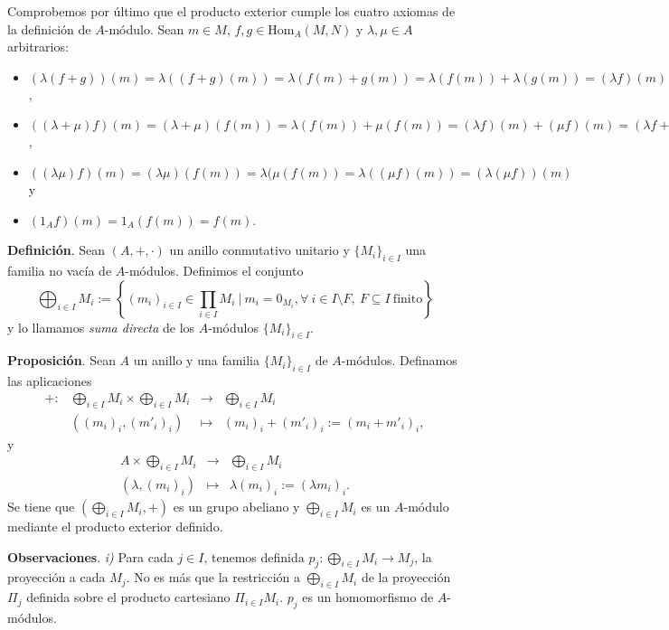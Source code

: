 \documentclass[a4paper,12pt]{article}
\newcommand{\Hom}{\text{Hom}}
\begin{document}
Comprobemos por último que el producto exterior cumple los cuatro axiomas de la definición de $A$-módulo. Sean $m\in M$, $f,g\in\Hom_A(M,N)$ y $\lambda,\mu\in A$ arbitrarios:
\begin{itemize}
    \item[\textit{i})] $(\lambda(f+g))(m)=\lambda((f+g)(m))=\lambda(f(m)+g(m))=\lambda(f(m))+\lambda(g(m))=(\lambda f)(m)+(\lambda g)(m)=(\lambda f+\lambda g)(m)$,
    \item[\textit{ii})] $((\lambda+\mu)f)(m)=(\lambda+\mu)(f(m))=\lambda(f(m))+\mu(f(m))=(\lambda f)(m)+(\mu f)(m)=(\lambda f+\mu f)(m)$,
    \item[\textit{iii})] $((\lambda\mu)f)(m)=(\lambda\mu)(f(m))=\lambda(\mu(f(m))=\lambda((\mu f)(m))=(\lambda(\mu f))(m)$ y
    \item[\textit{iv})] $(1_A f)(m)=1_A(f(m))=f(m)$.
\end{itemize}

\textbf{Definición}. Sean $(A,+,\cdot)$ un anillo conmutativo unitario y $\{M_i\}_{i\in I}$ una familia no vacía de $A$-módulos. Definimos el conjunto
$$
\bigoplus_{i\in I}M_i:=\left\{{(m_i)}_{i\in I}\in\prod_{i\in I}M_i\ |\ m_i=0_{M_i},\forall\ i\in I\setminus F,\ F\subseteq I\ \text{finito}\right\}
$$
y lo llamamos \textit{suma directa} de los $A$-módulos $\{M_i\}_{i\in I}$.

\textbf{Proposición}. Sean $A$ un anillo y una familia $\{M_i\}_{i\in I}$ de $A$-módulos. Definamos las aplicaciones
$$\begin{array}{rrcl}
    +:&\bigoplus_{i\in I}M_i\times\bigoplus_{i\in I}M_i&\longrightarrow&\bigoplus_{i\in I}M_i\\
    &({(m_i)}_i,{(m'_i)}_i)&\longmapsto&{(m_i)}_i+{(m'_i)}_i:={(m_i+m'_i)}_i,
\end{array}$$
y
$$\begin{array}{rcl}
    A\times\bigoplus_{i\in I}M_i&\longrightarrow&\bigoplus_{i\in I}M_i\\
    (\lambda,{(m_i)}_i)&\longmapsto&\lambda{(m_i)}_i:={(\lambda m_i)}_i.
\end{array}$$
Se tiene que $(\bigoplus_{i\in I}M_i,+)$ es un grupo abeliano y $\bigoplus_{i\in I}M_i$ es un $A$-módulo mediante el producto exterior definido.

\textbf{Observaciones}. \textit{\textit{i})} Para cada $j\in I$, tenemos definida $p_j:\bigoplus_{i\in I}M_i\rightarrow M_j$, la proyección a cada $M_j$. No es más que la restricción a $\bigoplus_{i\in I}M_i$ de la proyección $\Pi_j$ definida sobre el producto cartesiano $\Pi_{i\in I}M_i$. $p_j$ es un homomorfismo de $A$-módulos.
\end{document}

